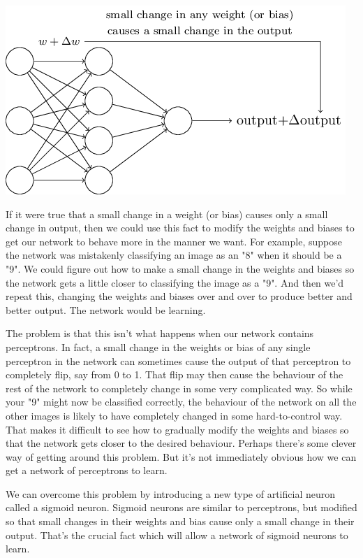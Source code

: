 \documentclass[a4paper,12pt]{report}%
\begin{document}
\begin{center}
 \includegraphics[width=0.8\linewidth]{images/tikz8.png}
\end{center}

If it were true that a small change in a weight (or bias) causes only a small change in output, then we could use this fact to modify the weights and biases to get our network to behave more in the manner we want. For example, suppose the network was mistakenly classifying an image as an "8" when it should be a "9". We could figure out how to make a small change in the weights and biases so the network gets a little closer to classifying the image as a "9". And then we'd repeat this, changing the weights and biases over and over to produce better and better output. The network would be learning.

The problem is that this isn't what happens when our network contains perceptrons. In fact, a small change in the weights or bias of any single perceptron in the network can sometimes cause the output of that perceptron to completely flip, say from 0 to 1. That flip may then cause the behaviour of the rest of the network to completely change in some very complicated way. So while your "9" might now be classified correctly, the behaviour of the network on all the other images is likely to have completely changed in some hard-to-control way. That makes it difficult to see how to gradually modify the weights and biases so that the network gets closer to the desired behaviour. Perhaps there's some clever way of getting around this problem. But it's not immediately obvious how we can get a network of perceptrons to learn.

We can overcome this problem by introducing a new type of artificial neuron called a sigmoid neuron. Sigmoid neurons are similar to perceptrons, but modified so that small changes in their weights and bias cause only a small change in their output. That's the crucial fact which will allow a network of sigmoid neurons to learn.
\end{document}

